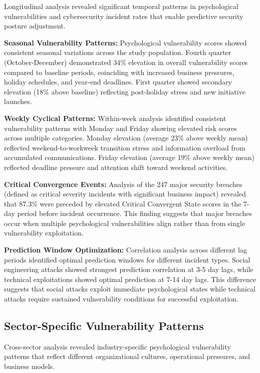 \documentclass[10pt, twocolumn]{article}
\begin{document}
Longitudinal analysis revealed significant temporal patterns in psychological vulnerabilities and cybersecurity incident rates that enable predictive security posture adjustment.

\textbf{Seasonal Vulnerability Patterns:} Psychological vulnerability scores showed consistent seasonal variations across the study population. Fourth quarter (October-December) demonstrated 34\% elevation in overall vulnerability scores compared to baseline periods, coinciding with increased business pressures, holiday schedules, and year-end deadlines. First quarter showed secondary elevation (18\% above baseline) reflecting post-holiday stress and new initiative launches.

\textbf{Weekly Cyclical Patterns:} Within-week analysis identified consistent vulnerability patterns with Monday and Friday showing elevated risk scores across multiple categories. Monday elevation (average 23\% above weekly mean) reflected weekend-to-workweek transition stress and information overload from accumulated communications. Friday elevation (average 19\% above weekly mean) reflected deadline pressure and attention shift toward weekend activities.

\textbf{Critical Convergence Events:} Analysis of the 247 major security breaches (defined as critical severity incidents with significant business impact) revealed that 87.3\% were preceded by elevated Critical Convergent State scores in the 7-day period before incident occurrence. This finding suggests that major breaches occur when multiple psychological vulnerabilities align rather than from single vulnerability exploitation.

\textbf{Prediction Window Optimization:} Correlation analysis across different lag periods identified optimal prediction windows for different incident types. Social engineering attacks showed strongest prediction correlation at 3-5 day lags, while technical exploitations showed optimal prediction at 7-14 day lags. This difference suggests that social attacks exploit immediate psychological states while technical attacks require sustained vulnerability conditions for successful exploitation.

\subsection{Sector-Specific Vulnerability Patterns}

Cross-sector analysis revealed industry-specific psychological vulnerability patterns that reflect different organizational cultures, operational pressures, and business models.
\end{document}
